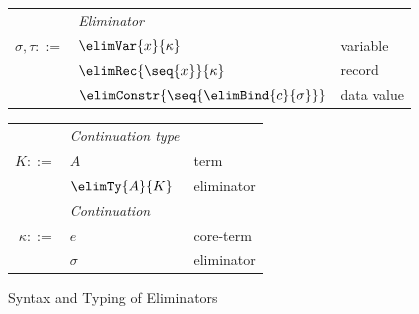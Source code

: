 \begin{figure}
   \begin{minipage}[t]{0.48\textwidth}
      \begin{tabularx}{\textwidth}{rL{2.7cm}L{3cm}}
          &\textit{Eliminator}&
          \\
          $\sigma, \tau ::=$
          &
          $\elimVar{x}{\kappa}$
          &
          variable
          \\
          &
          $\elimRec{\seq{x}}{\kappa}$
          &
          record
          \\
          &
          $\elimConstr{\seq{\elimBind{c}{\sigma}}}$
          &
          data value
          \\[0mm]
      \end{tabularx}
   \end{minipage}
   \begin{minipage}[t]{0.5\textwidth}
      \begin{tabularx}{\textwidth}{rL{2.7cm}L{3cm}}
      &\textit{Continuation type}&
      \\
      $K ::=$
      &
      $A$
      &
      term
      \\
      &
      $\elimTy{A}{K}$
      &
      eliminator
      \\[2mm]
      &\textit{Continuation}&
      \\
      $\kappa ::=$
      &
      $e$
      &
      core-term
      \\
      &
      $\sigma$
      &
      eliminator
      \\[2mm]
      \end{tabularx}
   \end{minipage}
   {\small \flushleft {}%
   \hfill {}}
   \caption{Syntax and Typing of Eliminators}
\end{figure}
